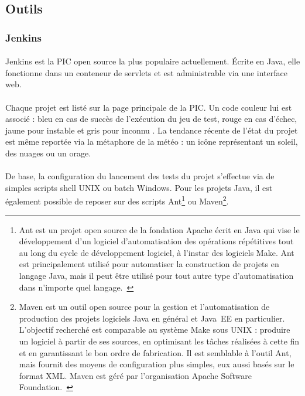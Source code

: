 \subsection{Outils}

\subsubsection{Jenkins}

\paragraph{}
Jenkins est la PIC open source la plus populaire actuellement.
Écrite en Java, elle fonctionne dans un conteneur de servlets et est administrable via une interface web.

\paragraph{}
Chaque projet est listé sur la page principale de la PIC.
Un code couleur lui est associé : bleu en cas de succès de l'exécution du jeu de test, rouge en cas d'échec, jaune pour \og instable \fg{} et gris pour \og inconnu \fg.
La tendance récente de l'état du projet est même reportée via la métaphore de la météo : un icône représentant un soleil, des nuages ou un orage.

\paragraph{}
De base, la configuration du lancement des tests du projet s'effectue via de simples scripts shell UNIX ou batch Windows.
Pour les projets Java, il est également possible de reposer sur des scripts Ant\footnote{Ant est un projet open source de la fondation Apache écrit en Java qui vise le développement d'un logiciel d'automatisation des opérations répétitives tout au long du cycle de développement logiciel, à l'instar des logiciels Make. Ant est principalement utilisé pour automatiser la construction de projets en langage Java, mais il peut être utilisé pour tout autre type d'automatisation dans n'importe quel langage.~\cite{ant}} ou Maven\footnote{Maven est un outil open source pour la gestion et l'automatisation de production des projets logiciels Java en général et Java~EE en particulier. L'objectif recherché est comparable au système Make sous UNIX : produire un logiciel à partir de ses sources, en optimisant les tâches réalisées à cette fin et en garantissant le bon ordre de fabrication. Il est semblable à l'outil Ant, mais fournit des moyens de configuration plus simples, eux aussi basés sur le format XML. Maven est géré par l'organisation Apache Software Foundation.~\cite{maven}}.

